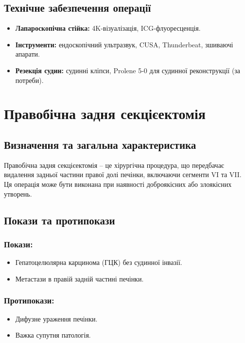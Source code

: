 \begin{refsection}
\subsection{Технічне забезпечення операції}
\begin{itemize}
    \item \textbf{Лапароскопічна стійка:} 4K-візуалізація, ICG-флуоресценція.
    \item \textbf{Інструменти:} ендоскопічний ультразвук, CUSA, Thunderbeat, зшиваючі апарати.
    \item \textbf{Резекція судин:} судинні кліпси, Prolene 5-0 для судинної реконструкції (за потреби).
\end{itemize}

\section{Правобічна задня секцієектомія}
\subsection{Визначення та загальна характеристика}
Правобічна задня секцієектомія – це хірургічна процедура, що передбачає видалення задньої частини правої долі печінки, включаючи сегменти VI та VII. Ця операція може бути виконана при наявності доброякісних або злоякісних утворень.

\subsection{Покази та протипокази}
\subsubsection{Покази:}
\begin{itemize}
    \item Гепатоцелюлярна карцинома (ГЦК) без судинної інвазії.
    \item Метастази в правій задній частині печінки.
\end{itemize}

\subsubsection{Протипокази:}
\begin{itemize}
    \item Дифузне ураження печінки.
    \item Важка супутня патологія.
\end{itemize}


\end{refsection}
